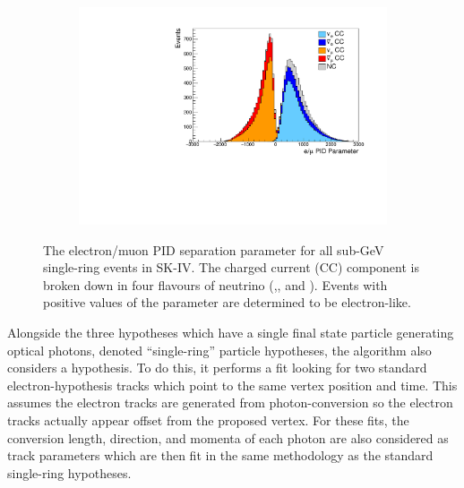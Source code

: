 \begin{figure}[h]
  \begin{subfigure}[t]{0.9\textwidth}
    \includegraphics[width=\textwidth, trim={0mm 0mm 0mm 0mm}, clip, page=1]{Figures/Selections/PIDParameter.pdf}
  \end{subfigure}
  \caption{The electron/muon PID separation parameter for all sub-GeV single-ring events in SK-IV. The charged current (CC) component is broken down in four flavours of neutrino (\quickmath{\nu_{\mu}},\quickmath{\bar{\nu}_{\mu}}, and ). Events with positive values of the parameter are determined to be electron-like.}
  \label{fig:Selection_EMUPIDParamDistribution}
\end{figure}

Alongside the three hypotheses which have a single final state particle generating optical photons, denoted ``single-ring'' particle hypotheses, the \fq algorithm also considers a  hypothesis. To do this, it performs a fit looking for two standard electron-hypothesis tracks which point to the same vertex position and time. This assumes the electron tracks are generated from photon-conversion so the electron tracks actually appear offset from the proposed  vertex. For these fits, the conversion length, direction, and momenta of each photon are also considered as track parameters which are then fit in the same methodology as the standard single-ring hypotheses. 

